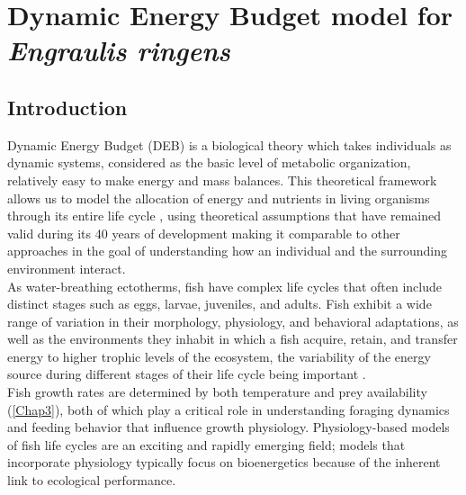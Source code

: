 \chapter{Dynamic Energy Budget model for \textit{Engraulis ringens}}\label{Chap4}

\clearpage
\section{Introduction}

Dynamic Energy Budget (DEB) is a biological theory which takes individuals as dynamic systems, considered as the basic level of metabolic organization, relatively easy to make energy and mass balances. This theoretical framework allows us to model the allocation of energy and nutrients in living organisms through its entire life cycle \citep{Kooi2009}, using theoretical assumptions that have remained valid during its 40 years of development \citep{Kooi2020} making it comparable to other approaches in the goal of understanding how an individual and the surrounding environment interact.\\

As water-breathing ectotherms, fish have complex life cycles that often include distinct stages such as eggs, larvae, juveniles, and adults. Fish exhibit a wide range of variation in their morphology, physiology, and behavioral adaptations, as well as the environments they inhabit \citep{Barl1961} in which a fish acquire, retain, and transfer energy to higher trophic levels of the ecosystem, the variability of the energy source during different stages of their life cycle being important \citep{Boul1981}.\\

Fish growth rates are determined by both temperature and prey availability (\ref{Chap3}), both of which play a critical role in understanding foraging dynamics and feeding behavior that influence growth physiology. Physiology-based models of fish life cycles are an exciting and rapidly emerging field; models that incorporate physiology typically focus on bioenergetics because of the inherent link to ecological performance.\\

